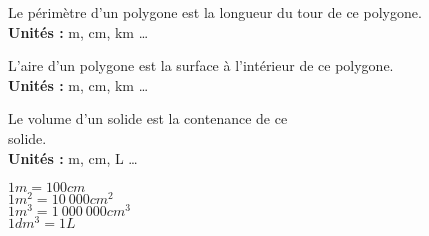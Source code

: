 \begin{minipage}[t]{0.32\textwidth}
    {Le périmètre d'un polygone est la longueur du tour de ce polygone.\\
    \textbf{Unités :} m, cm, km \dots}
\end{minipage}
\hfill
\begin{minipage}[t]{0.32\textwidth}
    {L'aire d'un polygone est la surface à l'intérieur de ce polygone.\\
    \textbf{Unités :} m, cm, km \dots}
\end{minipage}
\hfill
\begin{minipage}[t]{0.32\textwidth}
    {Le volume d'un solide est la contenance de ce\\ solide.\\
    \textbf{Unités :} m, cm, L \dots}
\end{minipage}

{\begin{multicols}{4}
    $1m=100cm$\\
    $1m^2 = 10~000cm^2$\\
    $1m^3 = 1~000~000cm^3$\\
    $1dm^3 = 1L$
\end{multicols}
}